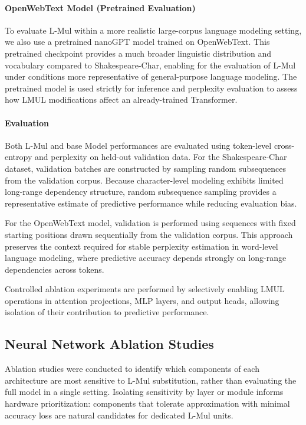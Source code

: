 \documentclass[12pt,letterpaper]{article}
\begin{document}
\paragraph{OpenWebText Model (Pretrained Evaluation)}
To evaluate L-Mul within a more realistic large-corpus language modeling setting, we also use a pretrained nanoGPT model trained on OpenWebText. This pretrained checkpoint provides a much broader linguistic distribution and vocabulary compared to Shakespeare-Char, enabling for the evaluation of L-Mul under conditions more representative of general-purpose language modeling. The pretrained model is used strictly for inference and perplexity evaluation to assess how LMUL modifications affect an already-trained Transformer.
\paragraph{Evaluation}
Both L-Mul and base Model performances are evaluated using token-level cross-entropy and perplexity on held-out validation data. For the Shakespeare-Char dataset, validation batches are constructed by sampling random subsequences from the validation corpus. Because character-level modeling exhibits limited long-range dependency structure, random subsequence sampling provides a representative estimate of predictive performance while reducing evaluation bias.

For the OpenWebText model, validation is performed using sequences with fixed starting positions drawn sequentially from the validation corpus. This approach preserves the context required for stable perplexity estimation in word-level language modeling, where predictive accuracy depends strongly on long-range dependencies across tokens.

Controlled ablation experiments are performed by selectively enabling LMUL operations in attention projections, MLP layers, and output heads, allowing isolation of their contribution to predictive performance.

\subsection{Neural Network Ablation Studies}

Ablation studies were conducted to identify which components of each architecture are most sensitive to L-Mul substitution, rather than evaluating the full model in a single setting. Isolating sensitivity by layer or module informs hardware prioritization: components that tolerate approximation with minimal accuracy loss are natural candidates for dedicated L-Mul units.
\end{document}
